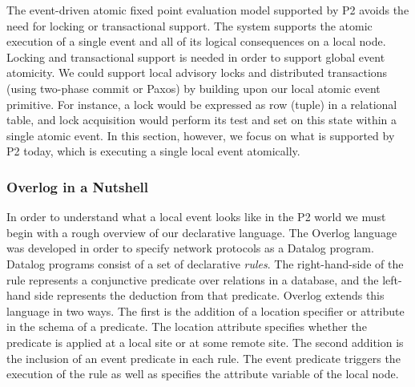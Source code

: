 {The event-driven atomic fixed point evaluation model supported by
P2 avoids the need for locking or transactional support. The system
supports the atomic execution of a single event and all of its
logical consequences on a local node. Locking and 
transactional support is needed in order to support global event atomicity. 
We could support local advisory locks and
distributed transactions (using two-phase commit or Paxos) by building upon our 
local atomic event primitive. For instance, a lock would be expressed 
as row (tuple) in a relational table, and lock acquisition would perform its test 
and set on this 
state within a single atomic event. In this section, however, we focus on what is 
supported by P2 today, which is executing a single local event atomically.

\subsubsection{Overlog in a Nutshell}

In order to understand what a local event looks like in the P2 world we must begin
with a rough overview of our declarative language. 
The Overlog language was developed in order to 
specify network protocols as a Datalog program. Datalog programs 
consist of a set of declarative {\em rules}. The right-hand-side
of the rule represents a conjunctive predicate over relations in a
database, and the left-hand side represents the deduction from that
predicate. Overlog extends this language in two ways. The first is
the addition of a location specifier or attribute in the schema of a
predicate. The location attribute specifies whether the predicate is
applied at a local site or at some remote site. The second addition is the inclusion
of an event predicate in each rule. The event predicate triggers the 
execution of the rule as well as specifies the attribute variable 
of the local node. 

}
